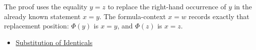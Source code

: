 \begin{remark*}
The proof uses the equality \(y=z\) to replace the right-hand occurrence of
\(y\) in the already known statement \(x=y\). The formula-context \(x=w\)
records exactly that replacement position: \(\Phi(y)\) is \(x=y\), and
\(\Phi(z)\) is \(x=z\).
\end{remark*}

\begin{dependencies}
\begin{itemize}
  \item \hyperref[ax:axiomatic-equality-substitution]{Substitution of Identicals}
\end{itemize}
\end{dependencies}

\clearpage
